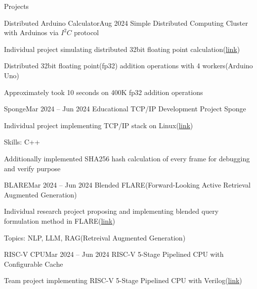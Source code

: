 \documentclass{resume}
\begin{document}
\begin{rSection}{Projects}
    \begin{rSubsection}{Distributed Arduino Calculator}{Aug 2024}
        Simple Distributed Computing Cluster with Arduinos via $I^2C$ protocol

        \item Individual project simulating distributed 32bit floating point calculation(\href{https://github.com/minsusun/kakashi/tree/main/avr/arduino/i2c-distributed-floating-point-calculator}{link})

        \item Distributed 32bit floating point(fp32) addition operations with 4 workers(Arduino Uno)

        \item Approximately took 10 seconds on 400K fp32 addition operations
    \end{rSubsection}

    \begin{rSubsection}{Sponge}{Mar 2024 -- Jun 2024}
        Educational TCP/IP Development Project Sponge

        \item Individual project implementing TCP/IP stack on Linux(\href{https://github.com/minsusun/csed353-sponge}{link})

        \item Skills: C++

        \item Additionally implemented SHA256 hash calculation of every frame for debugging and verify purpose
    \end{rSubsection}

    \begin{rSubsection}{BLARE}{Mar 2024 -- Jun 2024}
        Blended FLARE(Forward-Looking Active Retrieval Augmented Generation)

        \item Individual research project proposing and implementing blended query formulation method in FLARE(\href{https://github.com/minsusun/BLARE}{link})

        \item Topics: NLP, LLM, RAG(Retreival Augmented Generation)
    \end{rSubsection}

    \begin{rSubsection}{RISC-V CPU}{Mar 2024 -- Jun 2024}
        RISC-V 5-Stage Pipelined CPU with Configurable Cache

        \item Team project implementing RISC-V 5-Stage Pipelined CPU with Verilog(\href{https://github.com/minsusun/csed311/tree/main/lab5}{link})


\end{rSubsection}
\end{rSection}
\end{document}
